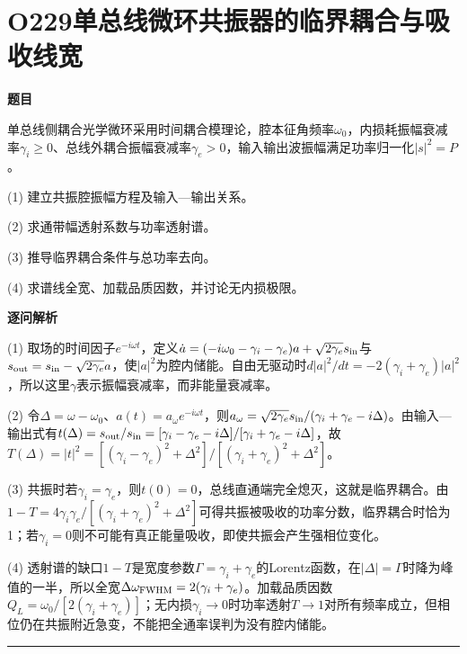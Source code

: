 \documentclass[UTF8,a4paper,11pt,oneside,openany]{ctexbook}
\begin{document}
\section*{O229\quad 单总线微环共振器的临界耦合与吸收线宽}
\textbf{题目}\par
单总线侧耦合光学微环采用时间耦合模理论，腔本征角频率$\omega_0$，内损耗振幅衰减率$\gamma_i\ge0$、总线外耦合振幅衰减率$\gamma_e>0$，输入输出波振幅满足功率归一化$|s|^2=P$。
\par\smallskip\noindent (1) 建立共振腔振幅方程及输入—输出关系。
\par\smallskip\noindent (2) 求通带幅透射系数与功率透射谱。
\par\smallskip\noindent (3) 推导临界耦合条件与总功率去向。
\par\smallskip\noindent (4) 求谱线全宽、加载品质因数，并讨论无内损极限。
\par\medskip\textbf{逐问解析}\par
\par\smallskip\noindent (1) 取场的时间因子$e^{-i\omega t}$，定义$\dot a=(-i\omega_0-\gamma_i-\gamma_e)a+\sqrt{2\gamma_e}s_{\rm in}$与$s_{\rm out}=s_{\rm in}-\sqrt{2\gamma_e}a$，使$|a|^2$为腔内储能。自由无驱动时$d|a|^2/dt=-2(\gamma_i+\gamma_e)|a|^2$，所以这里$\gamma$表示振幅衰减率，而非能量衰减率。
\par\smallskip\noindent (2) 令$\Delta=\omega-\omega_0$、$a(t)=a_\omega e^{-i\omega t}$，则$a_\omega=\sqrt{2\gamma_e}s_{\rm in}/(\gamma_i+\gamma_e-i\Delta)$。由输入—输出式有$t(\Delta)=s_{\rm out}/s_{\rm in}=[\gamma_i-\gamma_e-i\Delta]/[\gamma_i+\gamma_e-i\Delta]$，故$T(\Delta)=|t|^2=[(\gamma_i-\gamma_e)^2+\Delta^2]/[(\gamma_i+\gamma_e)^2+\Delta^2]$。
\par\smallskip\noindent (3) 共振时若$\gamma_i=\gamma_e$，则$t(0)=0$，总线直通端完全熄灭，这就是临界耦合。由$1-T=4\gamma_i\gamma_e/[(\gamma_i+\gamma_e)^2+\Delta^2]$可得共振被吸收的功率分数，临界耦合时恰为1；若$\gamma_i=0$则不可能有真正能量吸收，即使共振会产生强相位变化。
\par\smallskip\noindent (4) 透射谱的缺口$1-T$是宽度参数$\Gamma=\gamma_i+\gamma_e$的Lorentz函数，在$|\Delta|=\Gamma$时降为峰值的一半，所以全宽$\Delta\omega_{\rm FWHM}=2(\gamma_i+\gamma_e)$。加载品质因数$Q_L=\omega_0/[2(\gamma_i+\gamma_e)]$；无内损$\gamma_i\to0$时功率透射$T\to1$对所有频率成立，但相位仍在共振附近急变，不能把全通率误判为没有腔内储能。
\par\medskip\hrule\medskip
\end{document}
